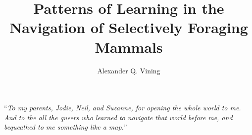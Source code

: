 \documentclass[twoside,12pt,final]{ucthesis-CA2012}
\begin{document}
\begin{ucfrontmatter}


  \title{Patterns of Learning in the Navigation of Selectively Foraging Mammals}
  \author{Alexander Q. Vining}

   
  \othermemberC{} %
  
	\maketitle
	
	\copyrightpage

    \begin{dedication}

      \vspace*{20ex}
      \begin{center}
      \begin{large}

        ``\emph{To my parents, Jodie, Neil, and Suzanne, for opening the whole world to me. And to the all the queers who learned to navigate that world before me, and bequeathed to me something like a map.}''


\end{large}
\end{center}
\end{dedication}
\end{ucfrontmatter}
\end{document}
